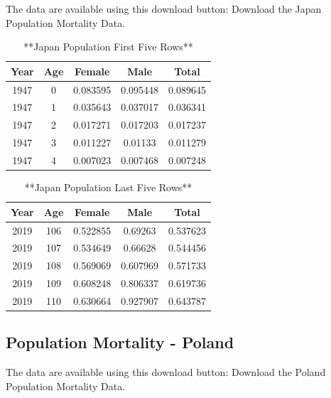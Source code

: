 \documentclass[
]{book}
\begin{document}
The data are available using this download button:
Download the Japan Population Mortality Data.

\begin{table}

\caption{\label{tab:unnamed-chunk-31}**Japan Population  First Five Rows**}
\centering
\begin{tabular}[t]{c|c|c|c|c}
\hline
Year & Age & Female & Male & Total\\
\hline
1947 & 0 & 0.083595 & 0.095448 & 0.089645\\
\hline
1947 & 1 & 0.035643 & 0.037017 & 0.036341\\
\hline
1947 & 2 & 0.017271 & 0.017203 & 0.017237\\
\hline
1947 & 3 & 0.011227 & 0.01133 & 0.011279\\
\hline
1947 & 4 & 0.007023 & 0.007468 & 0.007248\\
\hline
\end{tabular}
\end{table}

\begin{table}

\caption{\label{tab:unnamed-chunk-31}**Japan Population  Last Five Rows**}
\centering
\begin{tabular}[t]{c|c|c|c|c}
\hline
Year & Age & Female & Male & Total\\
\hline
2019 & 106 & 0.522855 & 0.69263 & 0.537623\\
\hline
2019 & 107 & 0.534649 & 0.66628 & 0.544456\\
\hline
2019 & 108 & 0.569069 & 0.607969 & 0.571733\\
\hline
2019 & 109 & 0.608248 & 0.806337 & 0.619736\\
\hline
2019 & 110 & 0.630664 & 0.927907 & 0.643787\\
\hline
\end{tabular}
\end{table}

\hypertarget{population-mortality---poland}{%
\subsection*{Population Mortality - Poland}\label{population-mortality---poland}}

The data are available using this download button:
Download the Poland Population Mortality Data.
\end{document}

